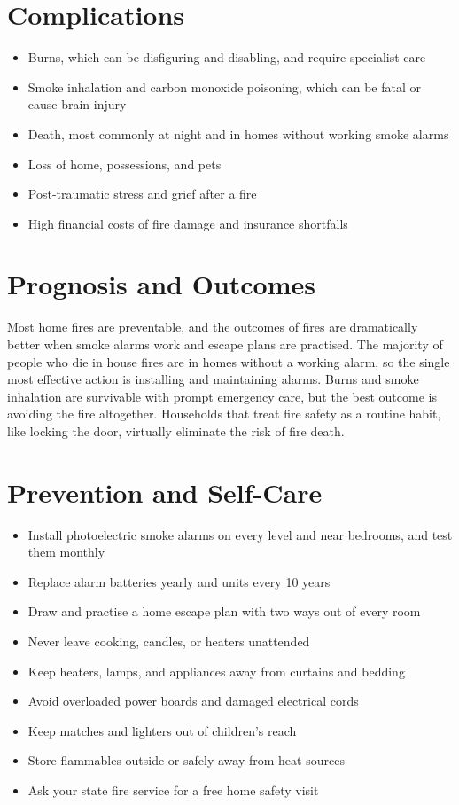 \section*{Complications}
\begin{itemize}
    \item Burns, which can be disfiguring and disabling, and require specialist care
    \item Smoke inhalation and carbon monoxide poisoning, which can be fatal or cause brain injury
    \item Death, most commonly at night and in homes without working smoke alarms
    \item Loss of home, possessions, and pets
    \item Post-traumatic stress and grief after a fire
    \item High financial costs of fire damage and insurance shortfalls
\end{itemize}

\section*{Prognosis and Outcomes}
Most home fires are preventable, and the outcomes of fires are dramatically better when smoke alarms work and escape plans are practised. The majority of people who die in house fires are in homes without a working alarm, so the single most effective action is installing and maintaining alarms. Burns and smoke inhalation are survivable with prompt emergency care, but the best outcome is avoiding the fire altogether. Households that treat fire safety as a routine habit, like locking the door, virtually eliminate the risk of fire death.

\section*{Prevention and Self-Care}
\begin{itemize}
    \item Install photoelectric smoke alarms on every level and near bedrooms, and test them monthly
    \item Replace alarm batteries yearly and units every 10 years
    \item Draw and practise a home escape plan with two ways out of every room
    \item Never leave cooking, candles, or heaters unattended
    \item Keep heaters, lamps, and appliances away from curtains and bedding
    \item Avoid overloaded power boards and damaged electrical cords
    \item Keep matches and lighters out of children's reach
    \item Store flammables outside or safely away from heat sources
    \item Ask your state fire service for a free home safety visit
\end{itemize}

